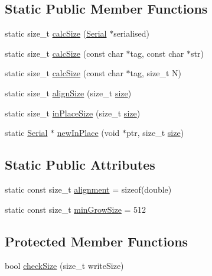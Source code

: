 \subsection*{Static Public Member Functions}
\begin{DoxyCompactItemize}
\item 
static size\+\_\+t \hyperlink{class_frame_lib___parameters_1_1_serial_a05ed411c98c4c7507c6cb2f6025d617f}{calc\+Size} (\hyperlink{class_frame_lib___parameters_1_1_serial}{Serial} $\ast$serialised)
\item 
static size\+\_\+t \hyperlink{class_frame_lib___parameters_1_1_serial_a183e96d800f8d225f18beac3bdb61b17}{calc\+Size} (const char $\ast$tag, const char $\ast$str)
\item 
static size\+\_\+t \hyperlink{class_frame_lib___parameters_1_1_serial_a44526eae9c814a6a699962f8cb36b151}{calc\+Size} (const char $\ast$tag, size\+\_\+t N)
\item 
static size\+\_\+t \hyperlink{class_frame_lib___parameters_1_1_serial_afe1693889f171a4fe7ccf005a0c46520}{align\+Size} (size\+\_\+t \hyperlink{class_frame_lib___parameters_1_1_serial_a04ad46904d9fd8119283eae663901886}{size})
\item 
static size\+\_\+t \hyperlink{class_frame_lib___parameters_1_1_serial_af2dce9c3db5d635bf715152678473bc3}{in\+Place\+Size} (size\+\_\+t \hyperlink{class_frame_lib___parameters_1_1_serial_a04ad46904d9fd8119283eae663901886}{size})
\item 
static \hyperlink{class_frame_lib___parameters_1_1_serial}{Serial} $\ast$ \hyperlink{class_frame_lib___parameters_1_1_serial_a10da741b93f9798f86a97240fd4b33e8}{new\+In\+Place} (void $\ast$ptr, size\+\_\+t \hyperlink{class_frame_lib___parameters_1_1_serial_a04ad46904d9fd8119283eae663901886}{size})
\end{DoxyCompactItemize}
\subsection*{Static Public Attributes}
\begin{DoxyCompactItemize}
\item 
static const size\+\_\+t \hyperlink{class_frame_lib___parameters_1_1_serial_a9932ac93f403097497aee15214b6e762}{alignment} = sizeof(double)
\item 
static const size\+\_\+t \hyperlink{class_frame_lib___parameters_1_1_serial_a3e9cdc14a396be22be1746c456080868}{min\+Grow\+Size} = 512
\end{DoxyCompactItemize}
\subsection*{Protected Member Functions}
\begin{DoxyCompactItemize}
\item 
bool \hyperlink{class_frame_lib___parameters_1_1_serial_a85681aac08fc30d99942fefee262a4ea}{check\+Size} (size\+\_\+t write\+Size)
\end{DoxyCompactItemize}

